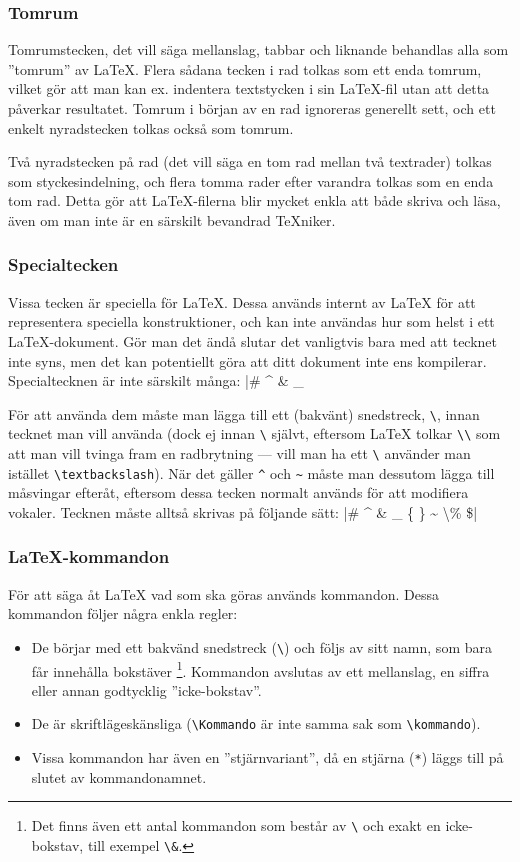 \documentclass[swe,10pt,nofont]{skrapport}
\makeatletter
\let\@oldLaTeX\LaTeX
\def\LaTeX{\texorpdfstring{\@oldLaTeX}{LaTeX}}
\newcommand\cmd[1]{\textenglish{\texttt{\textbackslash{}#1}}}%
\makeatother
\begin{document}
	\subsubsection{Tomrum}
	Tomrumstecken, det vill säga mellanslag, tabbar och liknande behandlas
	alla som ”tomrum” av \LaTeX{}. Flera sådana tecken i rad tolkas som ett
	enda tomrum, vilket gör att man kan ex. indentera textstycken i sin
	\LaTeX-fil utan att detta påverkar resultatet. Tomrum i början av en rad
	ignoreras generellt sett, och ett enkelt nyradstecken tolkas också som
	tomrum.
	
	Två nyradstecken på rad (det vill säga en tom rad mellan två textrader) tolkas som
	styckesindelning, och flera tomma rader efter varandra tolkas som en enda
	tom rad. Detta gör att \LaTeX{}-filerna blir mycket enkla att både skriva
	och läsa, även om man inte är en särskilt bevandrad \TeX{}niker.
	
	\subsubsection{Specialtecken}
	Vissa tecken är speciella för \LaTeX{}. Dessa används internt av \LaTeX{} 
	för att representera speciella konstruktioner, och kan inte användas hur som helst i ett \LaTeX-dokument. Gör man det ändå
	slutar det vanligtvis bara med att tecknet inte syns, men det kan
	potentiellt göra att ditt dokument inte ens kompilerar. Specialtecknen
	är inte särskilt många:
	\latex|# ^ & _ { } ~ \ %
	
	För att använda dem måste man lägga till ett (bakvänt) snedstreck,
	\cmd{}, innan tecknet man vill använda (dock ej innan
	\cmd{} självt, eftersom \LaTeX{} tolkar
	\cmd{\textbackslash} som att man vill tvinga fram en
	radbrytning — vill man ha ett \cmd{} använder man istället
	\cmd{textbackslash}).
	När det gäller \verb|^| och \verb|~| måste man
	dessutom lägga till måsvingar efteråt, eftersom dessa tecken normalt används för att
	modifiera vokaler. Tecknen måste alltså skrivas på följande sätt:
	\latex|\# \^{} \& \_ \{ \} \~{} \textbackslash \% \$|
	
	\subsubsection{\LaTeX-kommandon}
	För att säga åt \LaTeX{} vad som ska göras används kommandon. Dessa
	kommandon följer några enkla regler:
	\begin{itemize}
		\item De börjar med ett bakvänd snedstreck (\cmd{}) och följs av sitt
		namn, som bara får innehålla bokstäver%
		\footnote{Det finns även ett antal kommandon som består av \cmd{} och
		exakt en icke-bokstav, till exempel \cmd{\&}.}.
		Kommandon avslutas av ett
		mellanslag, en siffra eller annan godtycklig ”icke-bokstav”.
		
		\item De är skriftlägeskänsliga (\cmd{Kommando} är inte samma sak som
		\cmd{kommando}).
		
		\item Vissa kommandon har även en ”stjärnvariant”, då en stjärna
		(\texttt{*}) läggs till på slutet av kommandonamnet.
	\end{itemize}
	
\end{document}
